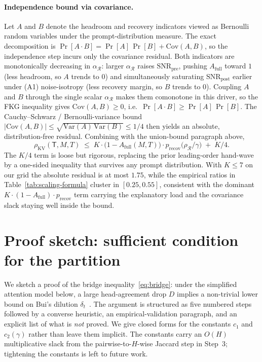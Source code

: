 \documentclass{article} %
\begin{document}
\paragraph{Independence bound via covariance.} Let $A$ and $B$ denote the
headroom and recovery indicators viewed as Bernoulli random variables under
the prompt-distribution measure. The exact decomposition is
$\Pr[A \cdot B] = \Pr[A]\,\Pr[B] + \mathrm{Cov}(A, B)$, so the independence
step incurs only the covariance residual. Both indicators are monotonically
decreasing in $\alpha_{\mathcal{R}}$: larger $\alpha_{\mathcal{R}}$ raises
$\mathrm{SNR}_{\mathrm{pre}}$, pushing $A_{\mathrm{full}}$ toward $1$ (less
headroom, so $A$ trends to $0$) and simultaneously saturating
$\mathrm{SNR}_{\mathrm{post}}$ earlier under (A1) noise-isotropy (less
recovery margin, so $B$ trends to $0$). Coupling $A$ and $B$ through the
single scalar $\alpha_{\mathcal{R}}$ makes them comonotone in this driver,
so the FKG inequality gives $\mathrm{Cov}(A, B) \ge 0$, i.e.\
$\Pr[A \cdot B] \ge \Pr[A]\,\Pr[B]$. The Cauchy--Schwarz / Bernoulli-variance
bound $|\mathrm{Cov}(A, B)| \le \sqrt{\mathrm{Var}(A)\,\mathrm{Var}(B)} \le 1/4$
then yields an absolute, distribution-free residual. Combining with the
union-bound paragraph above,
\[
\rho_{\mathrm{KV}}(\mathsf{T}, M, T)
\;\le\; K \cdot \bigl(1 - A_{\mathrm{full}}(M, T)\bigr)
\cdot p_{\mathrm{recov}}\bigl(\rho_{\mathcal{R}} / \gamma\bigr)
\;+\; K/4.
\]
The $K/4$ term is loose but rigorous, replacing the prior leading-order
hand-wave by a one-sided inequality that survives any prompt distribution.
With $K \le 7$ on our grid the absolute residual is at most $1.75$, while the
empirical ratios in Table~\ref{tab:scaling-formula} cluster in $[0.25, 0.55]$,
consistent with the dominant $K \cdot (1 - A_{\mathrm{full}}) \cdot
p_{\mathrm{recov}}$ term carrying the explanatory load and the covariance
slack staying well inside the bound.

\section{Proof sketch: sufficient condition for the partition}
\label{app:sufficient}

We sketch a proof of the bridge inequality~\eqref{eq:bridge}: under the
simplified attention model below, a large head-agreement drop $D$
implies a non-trivial lower bound on Bui's dilution
$\delta_t$~\citep{arxiv260509649}. The argument is structured as five
numbered steps followed by a converse heuristic, an empirical-validation
paragraph, and an explicit list of what is \emph{not} proved. We give
closed forms for the constants $c_1$ and $c_2(\gamma)$ rather than
leave them implicit. The constants carry an $O(H)$ multiplicative slack
from the pairwise-to-$H$-wise Jaccard step in Step~3; tightening the
constants is left to future work.
\end{document}
